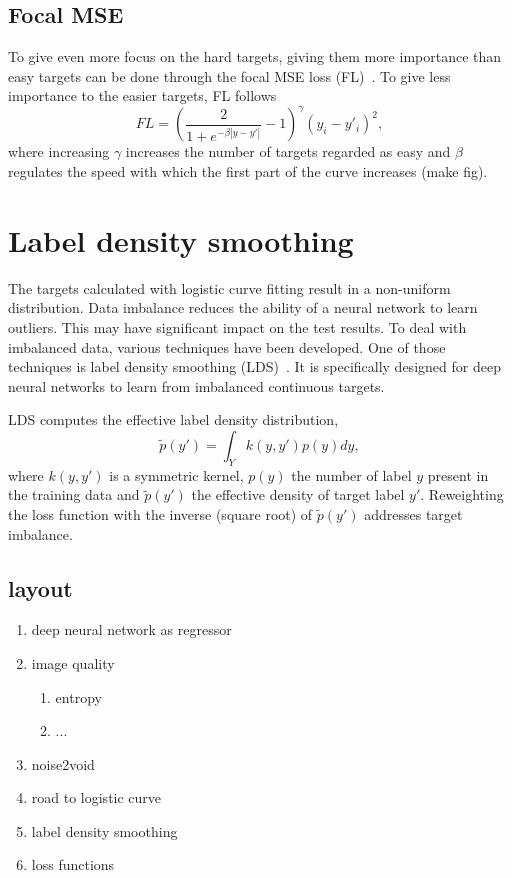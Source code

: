 \subsection{Focal MSE}
To give even more focus on the hard targets, giving them more importance than easy targets can be done through the focal MSE loss (FL)~\cite{Lu2022}.
To give less importance to the easier targets, FL follows
\begin{equation}
    FL = \left(\frac{2}{1 + e^{-\beta |y - y'|}} - 1 \right)^\gamma (y_i - y'_i)^2,
\end{equation}
where increasing $\gamma$ increases the number of targets regarded as easy and $\beta$ regulates the speed with which the first part of the curve increases (make fig).


\section{Label density smoothing}
The targets calculated with logistic curve fitting result in a non-uniform distribution.
Data imbalance reduces the ability of a neural network to learn outliers.
This may have significant impact on the test results.
To deal with imbalanced data, various techniques have been developed.
One of those techniques is label density smoothing (LDS)~\cite{yang2021delving}.
It is specifically designed for deep neural networks to learn from imbalanced continuous targets.

\newcommand{\edtl}{$\tilde{p}(y')$ }
LDS computes the effective label density distribution,
\begin{equation}
    \tilde{p}(y') = \int_Y k(y, y')p(y)dy,
\end{equation}
where $k(y,y')$ is a symmetric kernel, $p(y)$ the number of label $y$ present in the training data and \edtl the effective density of target label $y'$.
Reweighting the loss function with the inverse (square root) of \edtl addresses target imbalance.

\subsection*{layout}
\begin{enumerate}
    \item deep neural network as regressor
    \item image quality
          \begin{enumerate}
              \item entropy
              \item ...
          \end{enumerate}
    \item noise2void
    \item road to logistic curve
    \item label density smoothing
    \item loss functions
\end{enumerate}

